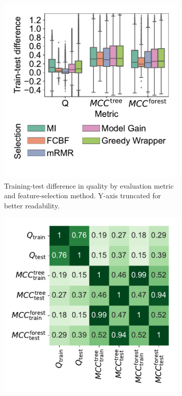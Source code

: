 \documentclass{article}
\theoremstyle{definition}
\begin{document}
\begin{figure}[htb]
	\centering
	\begin{subfigure}[t]{0.48\textwidth}
		\centering
		\includegraphics[width=\textwidth, trim=15 15 15 15, clip]{plots/evaluation-metrics-overfitting.pdf}
		\caption{
			Training-test difference in quality by evaluation metric and feature-selection method.
			Y-axis truncated for better readability.
		}
		\label{fig:afs:evaluation-metrics-overfitting}
	\end{subfigure}
	\hfill
	\begin{subfigure}[t]{0.48\textwidth}
		\centering
		\includegraphics[width=\textwidth, trim=15 15 15 15, clip]{plots/evaluation-metrics-correlation.pdf}

\end{subfigure}
\end{figure}
\end{document}

